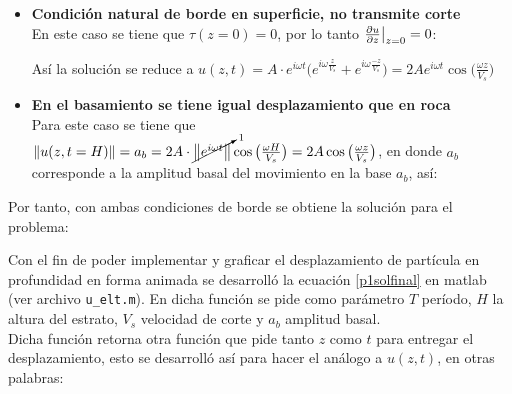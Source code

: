 \begin{itemize}
	\item \textbf{Condición natural de borde en superficie, no transmite corte} \\
	En este caso se tiene que $\tau(z=0)=0$, por lo tanto $\pdv{u}{z} \big|_{z=0}=0$:
	
	
	Así la solución se reduce a $u(z,t)=A\cdot e^{i\omega t} \bigg(e^{i\omega \frac{z}{V_s}}+e^{i\omega \frac{-z}{V_s}}\bigg) = 2A e^{i\omega t}\cos\big(\frac{\omega z}{V_s}\big)$
	
	\item \textbf{En el basamiento se tiene igual desplazamiento que en roca} \\
	
	Para este caso se tiene que $\norm{u(z,t=H)}=a_b = 2A\cdot\cancelto{1}{\norm{e^{i\omega t}}}\cos\big(\frac{\omega H}{V_s}\big) = 2A \cos\big(\frac{\omega z}{V_s}\big)$, en donde $a_b$ corresponde a la amplitud basal del movimiento en la base $a_b$, así:
	
\end{itemize}

Por tanto, con ambas condiciones de borde se obtiene la solución para el problema:



Con el fin de poder implementar y graficar el desplazamiento de partícula en profundidad en forma animada se desarrolló la ecuación \eqref{p1solfinal} en matlab (ver archivo \texttt{u\_elt.m}). En dicha función se pide como parámetro $T$ período, $H$ la altura del estrato, $V_s$ velocidad de corte y $a_b$ amplitud basal. \\

Dicha función retorna otra función que pide tanto $z$ como $t$ para entregar el desplazamiento, esto se desarrolló así para hacer el análogo a $u(z,t)$, en otras palabras:


